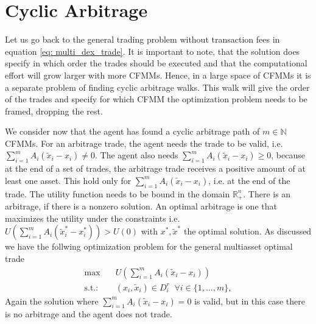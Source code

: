 \section{Cyclic Arbitrage}
Let us go back to the general trading problem without transaction fees in
equation \ref{eq: multi_dex_trade}. It is important to note, that the
solution does specify in which order the trades should be executed and that
the computational effort will grow larger with more CFMMs. Hence, in a large
space of CFMMs it is a separate problem of finding cyclic arbitrage walks. This
walk will give the order of the trades and specify for which CFMM the
optimization problem needs to be framed, dropping the rest.
\newline

We consider now that the agent has found a cyclic arbitrage path of $m \in
\mathbb{N} $ CFMMs. For an arbitrage trade, the agent needs the trade to be
valid, i.e. $\sum_{i=1}^{m} A_i(\tilde{x}_i-x_i) \neq 0$. The agent also
needs $\sum_{i=1}^{m} A_i(\tilde{x}_i-x_i) \ge 0$, because at the end
of a set of trades, the arbitrage trade receives a positive amount of at
least one asset. This hold only for $\sum_{i=1}^{m} A_i(\tilde{x}_i-x_i)$,
i.e. at the end of the trade. The utility function needs to be bound in the
domain $\mathbb{R}_+^{n}$. There is an arbitrage, if there is a nonzero
solution. An optimal arbitrage is one that maximizes the utility under the
constraints i.e. $U\left(\sum_{i=1}^{m} A_i(\tilde{x}^{*} _i-x^{*} _i)\right)
> U(0)$ with $x^{*}, \tilde{x}^{*} $ the optimal solution. As discussed we
have the follwing optimization problem for the general multiasset optimal
trade
\begin{align}
    \text{max} \quad &U\left(\sum_{i=1}^{m} A_i(\tilde{x}_i-x_i)\right) \label{eq: arb_trade}\\
    \text{s.t.:}\quad & (x_i, \tilde{x}_i) \in D_i^{r}
          \;\; \forall i \in
          \{1,\ldots,m\},
\end{align}
Again the solution where $\sum_{i=1}^{m} A_i(\tilde{x}_i-x_i)=0$ is valid, but in this case there is no arbitrage
and the agent does not trade.
